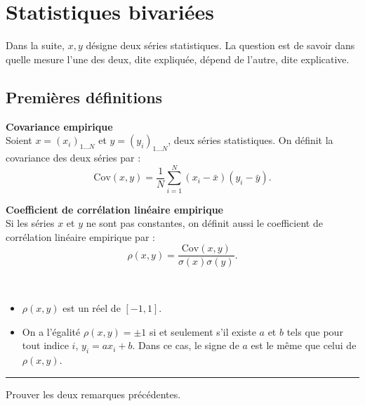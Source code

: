 \documentclass[../PolyS4.tex]{subfiles}
\begin{document}
\newpage

\section{Statistiques bivariées}

Dans la suite, $x, y$ désigne deux séries statistiques. La question est de savoir dans quelle mesure l'une des deux, dite expliquée, dépend de l'autre, dite explicative.

\subsection{Premières définitions}

\begin{Def}\textbf{Covariance empirique}\\

Soient $x = (x_i)_{1 \ldots N}$ et $y = (y_i)_{1 \ldots N}$, deux séries statistiques. On définit la covariance des deux séries par :
\[
\text{Cov}(x, y) = \frac{1}{N} \sum_{i=1}^{N} (x_i - \bar{x})(y_i - \bar{y}).
\]
\end{Def}

\begin{Def}\textbf{Coefficient de corrélation linéaire empirique}\\

Si les séries $x$ et $y$ ne sont pas constantes, on définit aussi le coefficient de corrélation linéaire empirique par :
\[
\rho(x, y) = \frac{\text{Cov}(x, y)}{\sigma(x) \sigma(y)}.
\]
\end{Def}

\begin{Rmq}$\,$

\begin{itemize}
    \item $\rho(x, y)$ est un réel de $[-1, 1]$.
    \item On a l'égalité $\rho(x, y) = \pm 1$ si et seulement s'il existe $a$ et $b$ tels que pour tout indice $i$, $y_i = ax_i + b$. Dans ce cas, le signe de $a$ est le même que celui de $\rho(x, y)$.
\end{itemize}
\end{Rmq}

\vspace{1em}
\hrule
\vspace{1em}


Prouver les deux remarques précédentes.
\end{document}
